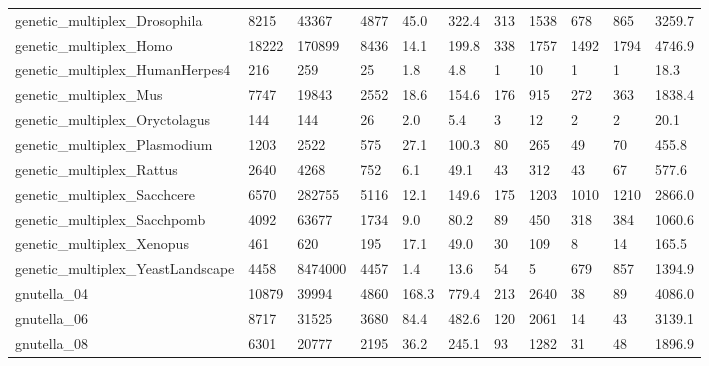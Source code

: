 \begin{longtable}{lllllllllll}
 genetic\_multiplex\_Drosophila                       & 8215       & 43367     & 4877  & 45.0   & 322.4  & 313   & 1538   & 678    & 865    & 3259.7  \\
 genetic\_multiplex\_Homo                             & 18222      & 170899    & 8436  & 14.1   & 199.8  & 338   & 1757   & 1492   & 1794   & 4746.9  \\
 genetic\_multiplex\_HumanHerpes4                     & 216        & 259       & 25    & 1.8    & 4.8    & 1     & 10     & 1      & 1      & 18.3    \\
 genetic\_multiplex\_Mus                              & 7747       & 19843     & 2552  & 18.6   & 154.6  & 176   & 915    & 272    & 363    & 1838.4  \\
 genetic\_multiplex\_Oryctolagus                      & 144        & 144       & 26    & 2.0    & 5.4    & 3     & 12     & 2      & 2      & 20.1    \\
 genetic\_multiplex\_Plasmodium                       & 1203       & 2522      & 575   & 27.1   & 100.3  & 80    & 265    & 49     & 70     & 455.8   \\
 genetic\_multiplex\_Rattus                           & 2640       & 4268      & 752   & 6.1    & 49.1   & 43    & 312    & 43     & 67     & 577.6   \\
 genetic\_multiplex\_Sacchcere                        & 6570       & 282755    & 5116  & 12.1   & 149.6  & 175   & 1203   & 1010   & 1210   & 2866.0  \\
 genetic\_multiplex\_Sacchpomb                        & 4092       & 63677     & 1734  & 9.0    & 80.2   & 89    & 450    & 318    & 384    & 1060.6  \\
 genetic\_multiplex\_Xenopus                          & 461        & 620       & 195   & 17.1   & 49.0   & 30    & 109    & 8      & 14     & 165.5   \\
 genetic\_multiplex\_YeastLandscape                   & 4458       & 8474000   & 4457  & 1.4    & 13.6   & 54    & 5      & 679    & 857    & 1394.9  \\
 gnutella\_04                                        & 10879      & 39994     & 4860  & 168.3  & 779.4  & 213   & 2640   & 38     & 89     & 4086.0  \\
 gnutella\_06                                        & 8717       & 31525     & 3680  & 84.4   & 482.6  & 120   & 2061   & 14     & 43     & 3139.1  \\
 gnutella\_08                                        & 6301       & 20777     & 2195  & 36.2   & 245.1  & 93    & 1282   & 31     & 48     & 1896.9  \\

\end{longtable}
